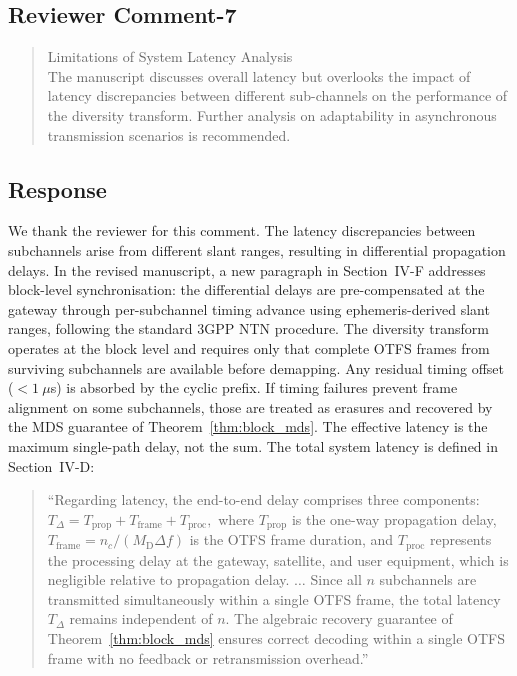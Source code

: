 \subsection{Reviewer Comment-7}



\begin{mdframed}
\begin{quote}

Limitations of System Latency Analysis \\
   The manuscript discusses overall latency but overlooks the impact of latency discrepancies between different sub-channels on the performance of the diversity transform. Further analysis on adaptability in asynchronous transmission scenarios is recommended.


\end{quote}

\end{mdframed}


\subsection{Response}

We thank the reviewer for this comment. The latency discrepancies between subchannels arise from different slant ranges, resulting in differential propagation delays. In the revised manuscript, a new paragraph in Section~IV-F addresses block-level synchronisation: the differential delays are pre-compensated at the gateway through per-subchannel timing advance using ephemeris-derived slant ranges, following the standard 3GPP NTN procedure. The diversity transform operates at the block level and requires only that complete OTFS frames from surviving subchannels are available before demapping. Any residual timing offset ($< 1~\mu$s) is absorbed by the cyclic prefix. If timing failures prevent frame alignment on some subchannels, those are treated as erasures and recovered by the MDS guarantee of Theorem~\ref{thm:block_mds}. The effective latency is the maximum single-path delay, not the sum. The total system latency is defined in Section~IV-D:

\begin{quote}
``Regarding latency, the end-to-end delay comprises three
components: $T_{\Delta} = T_{\mathrm{prop}} + T_{\mathrm{frame}}
+ T_{\mathrm{proc}},$
where $T_{\mathrm{prop}}$ is the one-way propagation delay,
$T_{\mathrm{frame}} = n_c/(M_{\mathrm{D}}\Delta f)$ is the OTFS
frame duration, and $T_{\mathrm{proc}}$ represents the processing
delay at the gateway, satellite, and user equipment, which is
negligible relative to propagation delay. $\ldots$
Since all $n$ subchannels are transmitted simultaneously within
a single OTFS frame, the total latency $T_{\Delta}$ remains
independent of $n$. The algebraic recovery guarantee of
Theorem~\ref{thm:block_mds} ensures correct decoding within a
single OTFS frame with no feedback or retransmission overhead.''
\end{quote}

